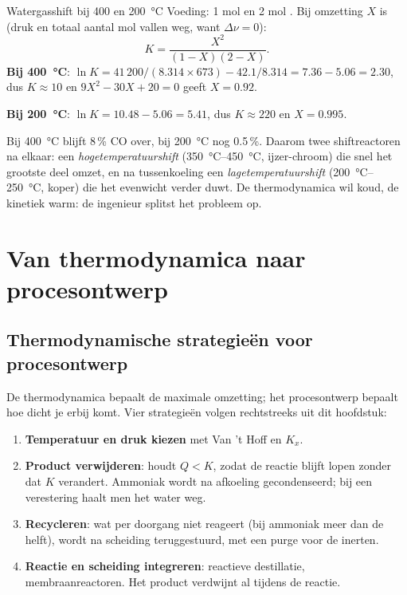\begin{voorbeeld}{Watergasshift bij 400 en \SI{200}{\celsius}}
Voeding: 1 mol  en 2 mol . Bij omzetting $X$ is (druk en totaal aantal mol vallen weg, want $\Delta\nu = 0$):
\[
K = \frac{X^2}{(1-X)(2-X)}.
\]
\textbf{Bij \SI{400}{\celsius}}: $\ln K = 41\,200/(8.314 \times 673) - 42.1/8.314 = 7.36 - 5.06 = 2.30$, dus $K \approx 10$ en $9X^2 - 30X + 20 = 0$ geeft $X = 0.92$.

\textbf{Bij \SI{200}{\celsius}}: $\ln K = 10.48 - 5.06 = 5.41$, dus $K \approx 220$ en $X = 0.995$.

Bij \SI{400}{\celsius} blijft 8\,\% CO over, bij \SI{200}{\celsius} nog 0.5\,\%. Daarom twee shiftreactoren na elkaar: een \emph{hogetemperatuurshift} (\SIrange{350}{450}{\celsius}, ijzer-chroom) die snel het grootste deel omzet, en na tussenkoeling een \emph{lagetemperatuurshift} (\SIrange{200}{250}{\celsius}, koper) die het evenwicht verder duwt. De thermodynamica wil koud, de kinetiek warm: de ingenieur splitst het probleem op.
\end{voorbeeld}

\section{Van thermodynamica naar procesontwerp}

\subsection{Thermodynamische strategie\"en voor procesontwerp}
\label{sec:procesontwerp-strategieen}

De thermodynamica bepaalt de maximale omzetting; het procesontwerp bepaalt hoe dicht je erbij komt. Vier strategie\"en volgen rechtstreeks uit dit hoofdstuk:
\begin{enumerate}
\item \textbf{Temperatuur en druk kiezen} met Van 't Hoff en $K_x$.
\item \textbf{Product verwijderen}: houdt $Q < K$, zodat de reactie blijft lopen zonder dat $K$ verandert. Ammoniak wordt na afkoeling gecondenseerd; bij een verestering haalt men het water weg.
\item \textbf{Recycleren}: wat per doorgang niet reageert (bij ammoniak meer dan de helft), wordt na scheiding teruggestuurd, met een purge voor de inerten.
\item \textbf{Reactie en scheiding integreren}: reactieve destillatie, membraanreactoren. Het product verdwijnt al tijdens de reactie.
\end{enumerate}

